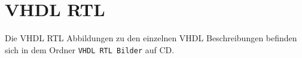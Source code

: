 \section{VHDL RTL}

Die VHDL RTL Abbildungen zu den einzelnen VHDL Beschreibungen befinden sich in dem Ordner \lstinline{VHDL RTL Bilder} auf CD.